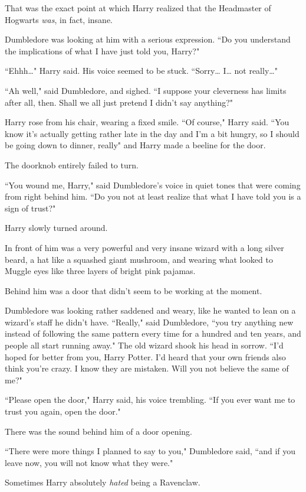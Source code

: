 That was the exact point at which Harry realized that the Headmaster of Hogwarts \emph{was}, in fact, insane.

Dumbledore was looking at him with a serious expression. ``Do you understand the implications of what I have just told you, Harry?"

``Ehhh{\ldots}" Harry said. His voice seemed to be stuck. ``Sorry{\ldots} I{\ldots} not really{\ldots}"

``Ah well," said Dumbledore, and sighed. ``I suppose your cleverness has limits after all, then. Shall we all just pretend I didn't say anything?"

Harry rose from his chair, wearing a fixed smile. ``Of course," Harry said. ``You know it's actually getting rather late in the day and I'm a bit hungry, so I should be going down to dinner, really" and Harry made a beeline for the door.

The doorknob entirely failed to turn.

``You wound me, Harry," said Dumbledore's voice in quiet tones that were coming from right behind him. ``Do you not at least realize that what I have told you is a sign of trust?"

Harry slowly turned around.

In front of him was a very powerful and very insane wizard with a long silver beard, a hat like a squashed giant mushroom, and wearing what looked to Muggle eyes like three layers of bright pink pajamas.

Behind him was a door that didn't seem to be working at the moment.

Dumbledore was looking rather saddened and weary, like he wanted to lean on a wizard's staff he didn't have. ``Really," said Dumbledore, ``you try anything new instead of following the same pattern every time for a hundred and ten years, and people all start running away." The old wizard shook his head in sorrow. ``I'd hoped for better from you, Harry Potter. I'd heard that your own friends also think you're crazy. I know they are mistaken. Will you not believe the same of me?"

``Please open the door," Harry said, his voice trembling. ``If you ever want me to trust you again, open the door."

There was the sound behind him of a door opening.

``There were more things I planned to say to you," Dumbledore said, ``and if you leave now, you will not know what they were."

Sometimes Harry absolutely \emph{hated} being a Ravenclaw.

